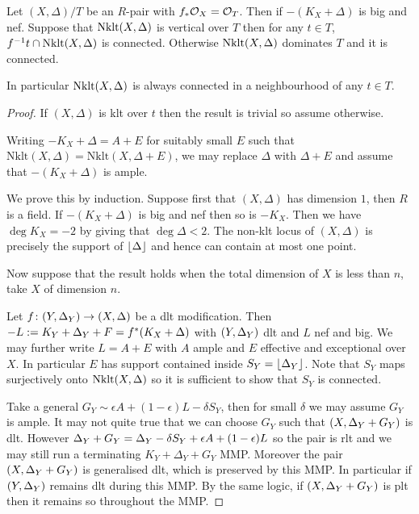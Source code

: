 \begin{theorem}\label{WLC}
	Let $(X,\Delta)/T$ be an $R$-pair with $f_{*}\ox = \ox[T]$. Then if $-(K_{X}+\Delta)$ is big and nef. Suppose that $\textup{Nklt}(X,\Delta)$ is vertical over $T$ then for any $t \in T$, $f^{-1}t \cap \textup{Nklt}(X,\Delta)$ is connected. Otherwise $\textup{Nklt}(X,\Delta)$ dominates $T$ and it is connected. 
	
	In particular $\textup{Nklt}(X,\Delta)$ is always connected in a neighbourhood of any $t\in T$.
\end{theorem}

\begin{proof}
	
	If $(X,\Delta)$ is klt over $t$ then the result is trivial so assume otherwise.
	
	Writing $-K_{X}+\Delta=A+E$ for suitably small $E$ such that $\text{Nklt}(X,\Delta)=\text{Nklt}(X,\Delta+E)$, we may replace $\Delta$ with $\Delta+E$ and assume that $-(K_{X}+\Delta)$ is ample. 
		
	We prove this by induction. Suppose first that $(X,\Delta)$ has dimension $1$, then $R$ is a field. If $-(K_{X}+\Delta)$ is big and nef then so is $-K_{X}$. Then we have $\deg K_{X} = -2$ by \cite[Corollary 2.8]{tanaka2018minimal} giving that $ \deg \Delta <2$. The non-klt locus of $(X,\Delta)$ is precisely the support of $\lfloor \D \rfloor$ and hence can contain at most one point.
	
	Now suppose that the result holds when the total dimension of $X$ is less than $n$, take $X$ of dimension $n$.
	
	Let $f \colon (Y,\D_{Y}) \to (X,\D)$ be a dlt modification. Then $-L:=K_{Y}+\D_{Y}+F=f^{*}(K_{X}+\D)$ with $(Y,\D_{Y})$ dlt and $L$ nef and big. We may further write $L=A+E$ with $A$ ample and $E$ effective and exceptional over $X$. In particular $E$ has support contained inside $S_{Y}=\lfloor \D_{Y} \rfloor$. Note that $S_{Y}$ maps surjectively onto $\nklt(X,\D)$ so it is sufficient to show that $S_{Y}$ is connected.
	
	Take a general $G_{Y} \sim \epsilon A +(1-\epsilon) L-\delta S_{Y}$, then for small $\delta$ we may assume $G_{Y}$ is ample. It may not quite true that we can choose $G_{Y}$ such that $(X,\D_{Y}+G_{Y})$ is dlt. However $\D_{Y}+G_{Y}=\D_{Y}-\delta S_{Y} +\epsilon A + (1-\epsilon)L$ so the pair is rlt and we may still run a terminating $K_{Y}+\Delta_{Y}+G_{Y}$ MMP. Moreover the pair $(X,\D_{Y}+G_{Y})$ is generalised dlt, which is preserved by this MMP. In particular if $(Y,\D_{Y})$ remains dlt during this MMP. By the same logic, if $(X,\D_{Y}+G_{Y})$ is plt then it remains so throughout the MMP.
	

\end{proof}

